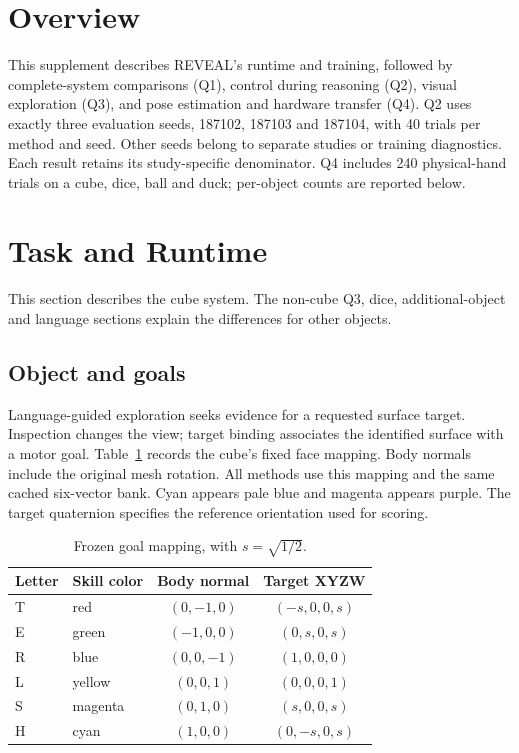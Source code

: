\section{Overview}
This supplement describes REVEAL's runtime and training, followed by complete-system comparisons (Q1), control during reasoning (Q2), visual exploration (Q3), and pose estimation and hardware transfer (Q4). Q2 uses exactly three evaluation seeds, 187102, 187103 and 187104, with 40 trials per method and seed. Other seeds belong to separate studies or training diagnostics. Each result retains its study-specific denominator. Q4 includes 240 physical-hand trials on a cube, dice, ball and duck; per-object counts are reported below.

\section{Task and Runtime}
This section describes the cube system. The non-cube Q3, dice, additional-object and language sections explain the differences for other objects.
\subsection{Object and goals}
Language-guided exploration seeks evidence for a requested surface target. Inspection changes the view; target binding associates the identified surface with a motor goal. Table~\ref{tab:mapping} records the cube's fixed face mapping. Body normals include the original mesh rotation. All methods use this mapping and the same cached six-vector bank. Cyan appears pale blue and magenta appears purple. The target quaternion specifies the reference orientation used for scoring.

\begin{table}[h]
\centering\small
\begin{tabular}{llcc}
\toprule
Letter & Skill color & Body normal & Target XYZW\\
\midrule
T & red & $(0,-1,0)$ & $(-s,0,0,s)$\\
E & green & $(-1,0,0)$ & $(0,s,0,s)$\\
R & blue & $(0,0,-1)$ & $(1,0,0,0)$\\
L & yellow & $(0,0,1)$ & $(0,0,0,1)$\\
S & magenta & $(0,1,0)$ & $(s,0,0,s)$\\
H & cyan & $(1,0,0)$ & $(0,-s,0,s)$\\
\bottomrule
\end{tabular}
\caption{Frozen goal mapping, with $s=\sqrt{1/2}$.}
\label{tab:mapping}
\end{table}


